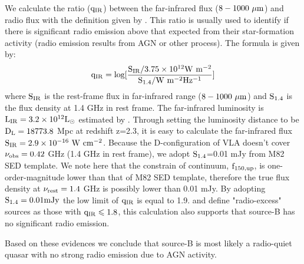 \documentclass[../Results.tex]{subfiles}
\begin{document}
	 We calculate the ratio ($\rm q_{IR}$) between the far-infrared flux ($\rm 8-1000 \ \mu m$) and radio flux with the definition given by \cite{ivison2010far}. This ratio is usually used to identify if there is significant radio emission above that expected from their star-formation activity (radio emission results from AGN or other process). The formula is given by:
	\begin{equation}
		\rm q_{IR}=log[\frac{S_{IR}/3.75 \times 10^{12} W \ m^{-2}}{S_{1.4}/W \ m^{-2} Hz^{-1}}]
		\label{q_IR}
	\end{equation}
	where $\rm S_{IR}$ is the rest-frame flux in far-infrared range ($8-1000 \ \rm \mu m $) and $\rm S_{1.4}$ is the flux density at 1.4 GHz in rest frame. The far-infrared luminosity is $\rm L_{IR}=3.2 \times 10^{12}L_{\odot}$ estimated by \citet{arrigoni2018overdensity}. Through setting the luminosity distance to be $\rm D_{L}=18773.8$ Mpc at redshift z=2.3, it is easy to calculate the far-infrared flux $\rm S_{IR}=2.9 \times 10^{-16}\ W \ cm^{-2}$.  Because the D-configuration of VLA doesn't cover $\rm \nu_{obs}=0.42$ GHz (1.4 GHz in rest frame), we adopt $\rm S_{1.4}$=0.01 mJy from M82 SED template. We note here that the constrain of continuum, $\rm f_{150,up}$, is one-order-magnitude lower than that of M82 SED template, therefore the true flux density at $\rm \nu_{rest}=1.4$ GHz is possibly lower than 0.01 mJy. By adopting $\rm S_{1.4}=0.01 mJy$ the low limit of $\rm q_{IR}$ is equal to 1.9. \citet{ivison2010far} and \citet{del2013goods} define "radio-excess" sources as those with $\rm q_{IR} \leqslant 1.8$, this calculation also supports that source-B has no significant radio emission.
	
	Based on these evidences we conclude that source-B is most likely a radio-quiet quasar with no strong radio emission due to AGN activity.
\end{document}

